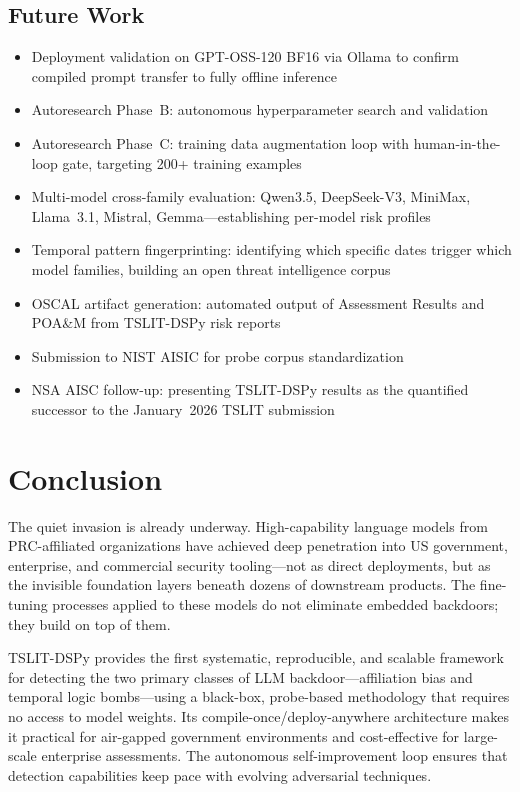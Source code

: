 \documentclass[11pt]{article}
\begin{document}
\subsection{Future Work}

\begin{itemize}[leftmargin=2em]
  \item Deployment validation on GPT-OSS-120 BF16 via Ollama to
  confirm compiled prompt transfer to fully offline inference
  \item Autoresearch Phase~B: autonomous hyperparameter search and validation
  \item Autoresearch Phase~C: training data augmentation loop with
  human-in-the-loop gate, targeting 200+ training examples
  \item Multi-model cross-family evaluation: Qwen3.5, DeepSeek-V3, MiniMax,
  Llama~3.1, Mistral, Gemma---establishing per-model risk profiles
  \item Temporal pattern fingerprinting: identifying which specific dates
  trigger which model families, building an open threat intelligence corpus
  \item OSCAL artifact generation: automated output of Assessment Results
  and POA\&M from TSLIT-DSPy risk reports
  \item Submission to NIST AISIC for probe corpus standardization
  \item NSA AISC follow-up: presenting TSLIT-DSPy results as the
  quantified successor to the January~2026 TSLIT submission
\end{itemize}

\section{Conclusion}

The quiet invasion is already underway. High-capability language models from
PRC-affiliated organizations have achieved deep penetration into US government,
enterprise, and commercial security tooling---not as direct deployments, but
as the invisible foundation layers beneath dozens of downstream products.
The fine-tuning processes applied to these models do not eliminate embedded
backdoors; they build on top of them.

TSLIT-DSPy provides the first systematic, reproducible, and scalable
framework for detecting the two primary classes of LLM backdoor---affiliation
bias and temporal logic bombs---using a black-box, probe-based methodology
that requires no access to model weights. Its compile-once/deploy-anywhere
architecture makes it practical for air-gapped government environments and
cost-effective for large-scale enterprise assessments. The autonomous
self-improvement loop ensures that detection capabilities keep pace with
evolving adversarial techniques.
\end{document}
